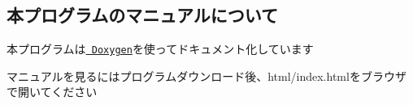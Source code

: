 \subsection*{本プログラムのマニュアルについて}


\begin{DoxyItemize}
\item 本プログラムは\href{http://www.doxygen.nl/index.html}{\texttt{ Doxygen}}を使ってドキュメント化しています
\item マニュアルを見るにはプログラムダウンロード後、html/index.htmlをブラウザで開いてください 
\end{DoxyItemize}